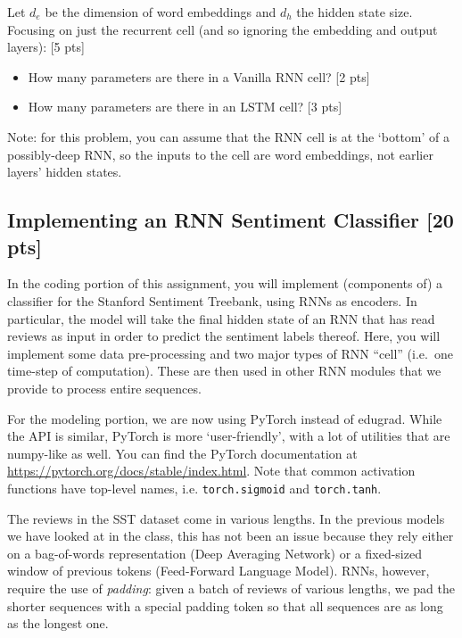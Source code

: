 \documentclass[11pt]{article}
\begin{document}
\vspace{2em}
  Let $d_e$ be the dimension of word embeddings and $d_h$ the hidden state size.  Focusing on just the recurrent cell (and so ignoring the embedding and output layers): \hfill [5 pts]
\begin{itemize}
  \item How many parameters are there in a Vanilla RNN cell? \hfill [2 pts]
  \item How many parameters are there in an LSTM cell? \hfill [3 pts]
\end{itemize}
Note: for this problem, you can assume that the RNN cell is at the `bottom' of a possibly-deep RNN, so the inputs to the cell are word embeddings, not earlier layers' hidden states.


\subsection{Implementing an RNN Sentiment Classifier [20 pts]}

In the coding portion of this assignment, you will implement (components of) a classifier for the Stanford Sentiment Treebank, using RNNs as encoders.  In particular, the model will take the final hidden state of an RNN that has read reviews as input in order to predict the sentiment labels thereof.  Here, you will implement some data pre-processing and two major types of RNN ``cell'' (i.e.\ one time-step of computation).  These are then used in other RNN modules that we provide to process entire sequences.

\noindent For the modeling portion, we are now using PyTorch instead of edugrad.  While the API is similar, PyTorch is more `user-friendly', with a lot of utilities that are numpy-like as well.  You can find the PyTorch documentation at \url{https://pytorch.org/docs/stable/index.html}.  Note that common activation functions have top-level names, i.e. \texttt{torch.sigmoid} and \texttt{torch.tanh}.

\vspace{2em}
 The reviews in the SST dataset come in various lengths.  In the previous models we have looked at in the class, this has not been an issue because they rely either on a bag-of-words representation (Deep Averaging Network) or a fixed-sized window of previous tokens (Feed-Forward Language Model).  RNNs, however, require the use of \emph{padding}: given a batch of reviews of various lengths, we pad the shorter sequences with a special padding token so that all sequences are as long as the longest one.
\end{document}

